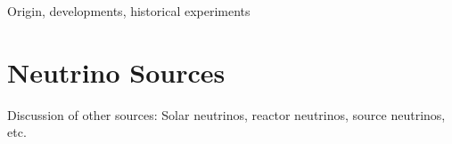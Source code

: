 




Origin, developments, historical experiments


\section{Neutrino Sources}
Discussion of other sources: Solar neutrinos, reactor neutrinos, source neutrinos, etc.

